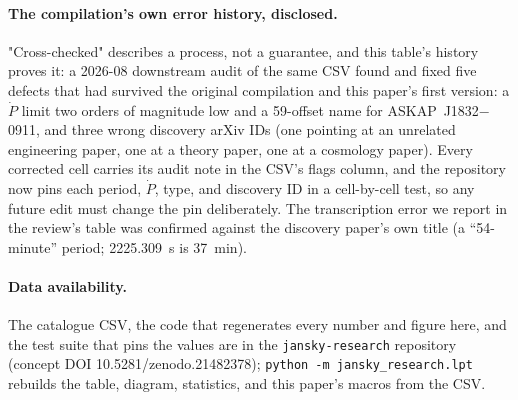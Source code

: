 \documentclass[twocolumn]{aastex631}
\newcommand{\code}[1]{\texttt{#1}}
\begin{document}
\paragraph{The compilation's own error history, disclosed.} "Cross-checked" describes a
process, not a guarantee, and this table's history proves it: a 2026-08 downstream audit of the
same CSV found and fixed five defects that had survived the original compilation and this
paper's first version: a $\dot P$ limit two orders of magnitude low and a
59\arcsec-offset name for ASKAP~J1832$-$0911, and three wrong discovery arXiv IDs (one
pointing at an unrelated engineering paper, one at a theory paper, one at a cosmology paper).
Every corrected cell carries its audit note in the CSV's flags column, and the repository now
pins each period, $\dot P$, type, and discovery ID in a cell-by-cell test, so any future edit
must change the pin deliberately. The transcription error we report in the review's table was
confirmed against the discovery paper's own title (a ``54-minute'' period; 2225.309~s is
37~min).

\paragraph{Data availability.} The catalogue CSV, the code that regenerates every number and
figure here, and the test suite that pins the values are in the \code{jansky-research}
repository (concept DOI 10.5281/zenodo.21482378); \code{python -m jansky\_research.lpt}
rebuilds the table, diagram, statistics, and this paper's macros from the CSV.


\end{document}
